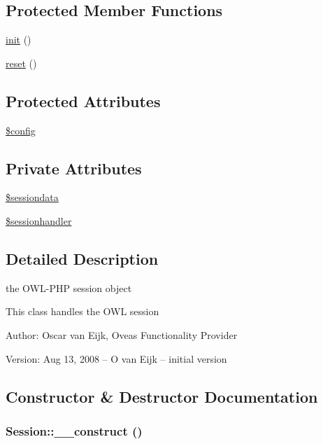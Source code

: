 \subsection*{Protected Member Functions}
\begin{CompactItemize}
\item 
\hyperlink{class__OWL_e0ef3ded56e8a6b34b6461e5a721cd3e}{init} ()
\item 
\hyperlink{class__OWL_2f2a042bcf31965194c03033df0edc9b}{reset} ()
\end{CompactItemize}
\subsection*{Protected Attributes}
\begin{CompactItemize}
\item 
\hyperlink{class__OWL_f37a011667dda12fc417a68a6f3077d1}{\$config}
\end{CompactItemize}
\subsection*{Private Attributes}
\begin{CompactItemize}
\item 
\hyperlink{classSession_ebcff26e749269269d3513336f17eaf1}{\$sessiondata}
\item 
\hyperlink{classSession_8ce7c23ff67100e8c62bb187cdf4921c}{\$sessionhandler}
\end{CompactItemize}


\subsection{Detailed Description}
the OWL-PHP session object 

This class handles the OWL session \begin{Desc}
\item[Author:]Oscar van Eijk, Oveas Functionality Provider \end{Desc}
\begin{Desc}
\item[Version:]Aug 13, 2008 -- O van Eijk -- initial version \end{Desc}


\subsection{Constructor \& Destructor Documentation}
\hypertarget{classSession_36373ba15d6c8f932aeea02d7320d7c8}{
\subsubsection{\setlength{\rightskip}{0pt plus 5cm}Session::\_\-\_\-construct ()}}
\label{classSession_36373ba15d6c8f932aeea02d7320d7c8}


